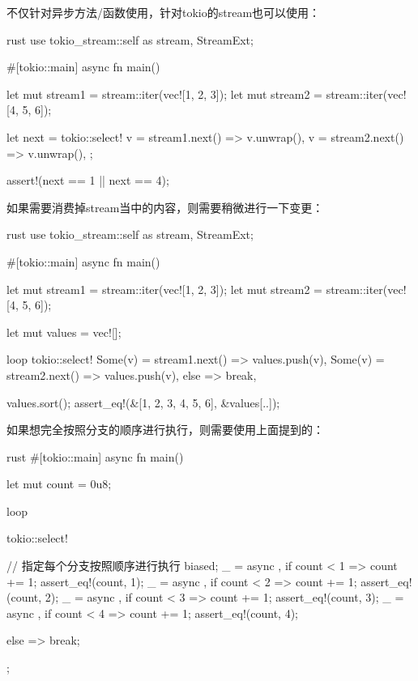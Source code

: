 不仅针对异步方法/函数使用，针对tokio的stream也可以使用：
\begin{code-block}{rust}
use tokio_stream::{self as stream, StreamExt};

#[tokio::main]
async fn main() {
    let mut stream1 = stream::iter(vec![1, 2, 3]);
    let mut stream2 = stream::iter(vec![4, 5, 6]);

    let next = tokio::select! {
        v = stream1.next() => v.unwrap(),
        v = stream2.next() => v.unwrap(),
    };

    assert!(next == 1 || next == 4);
}
\end{code-block}

如果需要消费掉stream当中的内容，则需要稍微进行一下变更：
\begin{code-block}{rust}
use tokio_stream::{self as stream, StreamExt};

#[tokio::main]
async fn main() {
    let mut stream1 = stream::iter(vec![1, 2, 3]);
    let mut stream2 = stream::iter(vec![4, 5, 6]);

    let mut values = vec![];

    loop {
        tokio::select! {
            Some(v) = stream1.next() => values.push(v),
            Some(v) = stream2.next() => values.push(v),
            else => break,
        }
    }

    values.sort();
    assert_eq!(&[1, 2, 3, 4, 5, 6], &values[..]);
}
\end{code-block}

如果想完全按照分支的顺序进行执行，则需要使用上面提到的：
\begin{code-block}{rust}
#[tokio::main]
async fn main() {
    let mut count = 0u8;

    loop {
        tokio::select! {
            // 指定每个分支按照顺序进行执行
            biased;
            _ = async {}, if count < 1 => {
                count += 1;
                assert_eq!(count, 1);
            }
            _ = async {}, if count < 2 => {
                count += 1;
                assert_eq!(count, 2);
            }
            _ = async {}, if count < 3 => {
                count += 1;
                assert_eq!(count, 3);
            }
            _ = async {}, if count < 4 => {
                count += 1;
                assert_eq!(count, 4);
            }

            else => {
                break;
            }
        };
    }
}
\end{code-block}

